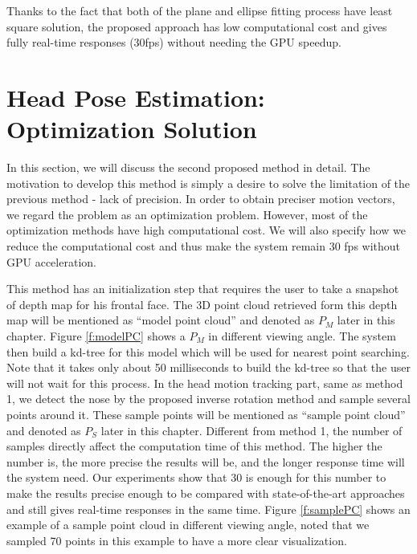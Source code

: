 Thanks to the fact that both of the plane and ellipse fitting process have least square solution, the proposed approach has low computational cost and gives fully real-time responses (30fps) without needing the GPU speedup.

\section{Head Pose Estimation: Optimization Solution}
\label{s:Method2}


In this section, we will discuss the second proposed method in detail. The motivation to develop this method is simply a desire to solve the limitation of the previous method - lack of precision. In order to obtain preciser motion vectors, we regard the problem as an optimization problem. However, most of the optimization methods have high computational cost. We will also specify how we reduce the computational cost and thus make the system remain 30 fps without GPU acceleration.

This method has an initialization step that requires the user to take a snapshot of depth map for his frontal face. The 3D point cloud retrieved form this depth map will be mentioned as ``model point cloud'' and denoted as $P_{M}$ later in this chapter. Figure \ref{f:modelPC} shows a $P_{M}$ in different viewing angle. The system then build a kd-tree for this model which will be used for nearest point searching. Note that it takes only about 50 milliseconds to build the kd-tree so that the user will not wait for this process. In the head motion tracking part, same as method 1, we detect the nose by the proposed inverse rotation method and sample several points around it. These sample points will be mentioned as ``sample point cloud'' and denoted as $P_{S}$ later in this chapter. Different from method 1, the number of samples directly affect the computation time of this method. The higher the number is, the more precise the results will be, and the longer response time will the system need. Our experiments show that 30 is enough for this number to make the results precise enough to be compared with state-of-the-art approaches and still gives real-time responses in the same time. Figure \ref{f:samplePC} shows an example of a sample point cloud in different viewing angle, noted that we sampled 70 points in this example to have a more clear visualization. 


